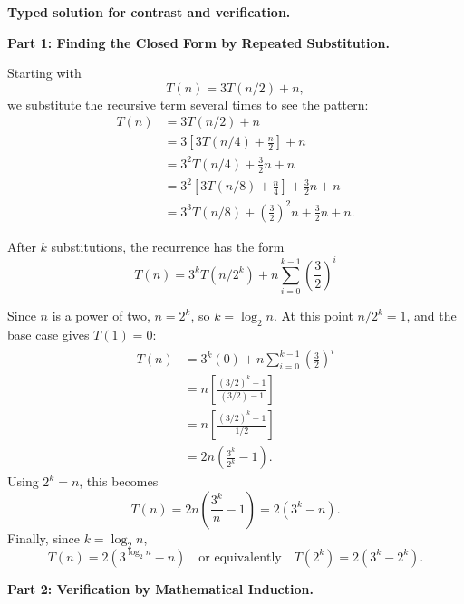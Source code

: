 \documentclass[12pt,a4paper]{article}
\begin{document}
\textbf{Typed solution for contrast and verification.}

\textbf{Part 1: Finding the Closed Form by Repeated Substitution.}

Starting with
\begin{equation*}
T(n)=3T(n/2)+n,
\end{equation*}
we substitute the recursive term several times to see the pattern:
\begin{align*}
T(n) &= 3T(n/2) + n \\
&= 3\left[3T(n/4)+\frac{n}{2}\right]+n \\
&= 3^2T(n/4)+\frac{3}{2}n+n \\
&= 3^2\left[3T(n/8)+\frac{n}{4}\right]+\frac{3}{2}n+n \\
&= 3^3T(n/8)+\left(\frac{3}{2}\right)^2n+\frac{3}{2}n+n.
\end{align*}

After $k$ substitutions, the recurrence has the form
\begin{equation*}
T(n) = 3^kT(n/2^k) + n\sum_{i=0}^{k-1}\left(\frac{3}{2}\right)^i
\end{equation*}

Since $n$ is a power of two, $n=2^k$, so $k=\log_2 n$. At this point $n/2^k=1$, and the base case gives $T(1)=0$:
\begin{align*}
T(n) &= 3^k(0)+n\sum_{i=0}^{k-1}\left(\frac{3}{2}\right)^i \\
&= n\left[\frac{(3/2)^k-1}{(3/2)-1}\right] \\
&= n\left[\frac{(3/2)^k-1}{1/2}\right] \\
&= 2n\left(\frac{3^k}{2^k}-1\right).
\end{align*}
Using $2^k=n$, this becomes
\begin{equation*}
T(n)=2n\left(\frac{3^k}{n}-1\right)=2(3^k-n).
\end{equation*}
Finally, since $k=\log_2 n$,
\begin{equation*}
T(n)=2(3^{\log_2 n}-n)
\quad \text{or equivalently} \quad
T(2^k)=2(3^k-2^k).
\end{equation*}

\textbf{Part 2: Verification by Mathematical Induction.}
\end{document}
